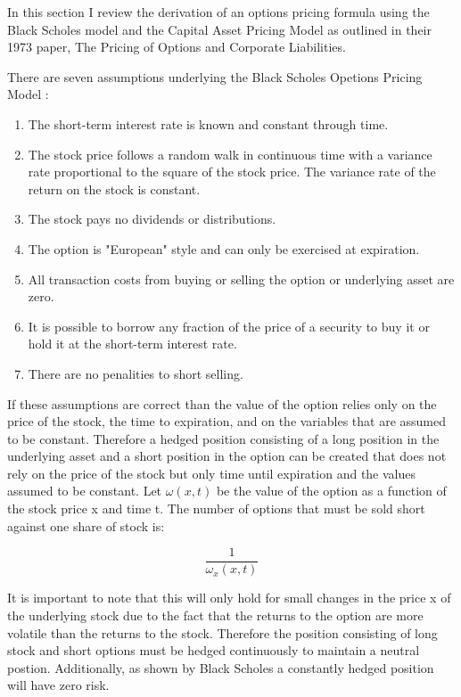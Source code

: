 \documentclass{article}
\begin{document}
In this section I review the derivation of an options pricing formula using the Black Scholes model and the Capital Asset Pricing Model as outlined in their 1973 paper, The Pricing of Options and Corporate Liabilities.

There are seven assumptions underlying the Black Scholes Opetions Pricing Model \cite{blackscholes73}:

\begin{enumerate}

\item The short-term interest rate is known and constant through time.
\item The stock price follows a random walk in continuous time with a variance rate proportional to the square of the stock price.  The variance rate of the return on the stock is constant.
\item  The stock pays no dividends or distributions.
\item The option is "European" style and can only be exercised at expiration.
\item All transaction costs from buying or selling the option or underlying asset are zero.
\item  It is possible to borrow any fraction of the price of a security to buy it or hold it at the short-term interest rate.
\item  There are no penalities to short selling.

\end{enumerate}

If these assumptions are correct than the value of the option relies only on the price of the stock, the time to expiration, and on the variables that are assumed to be constant.  Therefore a hedged position consisting of a long position in the underlying asset and a short position in the option can be created that does not rely on the price of the stock but only time until expiration and the values assumed to be constant.  Let $\omega(x,t)$ be the value of the option as a function of the stock price x and time t.  The number of options that must be sold short against one share of stock is:

\begin{equation}
\frac{1}{\omega_{x}(x,t)}
\end{equation}

It is important to note that this will only hold for small changes in the price x of the underlying stock due to the fact that the returns to the option are more volatile than the returns to the stock.  Therefore the position consisting of long stock and short options must be hedged continuously to maintain a neutral postion.  Additionally, as shown by Black Scholes a constantly hedged position will have zero risk.
\end{document}
